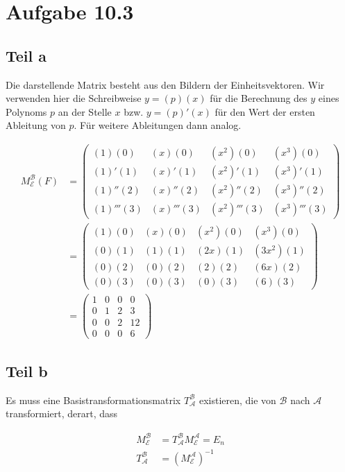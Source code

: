 \documentclass[a4paper,german,12pt,smallheadings]{scrartcl}
\begin{document}
\section*{Aufgabe 10.3}

\subsection*{Teil a}

Die darstellende Matrix besteht aus den Bildern der Einheitsvektoren. Wir
verwenden hier die Schreibweise $y = (p)(x)$ für die Berechnung des $y$ eines
Polynoms $p$ an der Stelle $x$ bzw. $y = (p)'(x)$ für den Wert der ersten
Ableitung von $p$. Für weitere Ableitungen dann analog.

\begin{align*}
  M^{\mathcal{B}}_{\mathcal{E}}(F) &=
\begin{pmatrix}
(1)(0)    & (x)(0)    & (x^2)(0)    & (x^3)(0)    \\
(1)'(1)   & (x)'(1)   & (x^2)'(1)   & (x^3)'(1)   \\
(1)''(2)  & (x)''(2)  & (x^2)''(2)  & (x^3)''(2)  \\
(1)'''(3) & (x)'''(3) & (x^2)'''(3) & (x^3)'''(3)
\end{pmatrix} \\
&=
\begin{pmatrix}
(1)(0) & (x)(0) & (x^2)(0) & (x^3)(0)  \\
(0)(1) & (1)(1) & (2x)(1)  & (3x^2)(1) \\
(0)(2) & (0)(2) & (2)(2)   & (6x)(2)   \\
(0)(3) & (0)(3) & (0)(3)   & (6)(3)
\end{pmatrix} \\
&=
\begin{pmatrix}
1 & 0 & 0 & 0  \\
0 & 1 & 2 & 3  \\
0 & 0 & 2 & 12 \\
0 & 0 & 0 & 6
\end{pmatrix}
\end{align*}

\subsection*{Teil b}

Es muss eine Basistransformationsmatrix $T^{\mathcal{B}}_{\mathcal{A}}$ existieren, die von $\mathcal{B}$ nach $\mathcal{A}$ transformiert, derart, dass

\begin{align*}
  M^{\mathcal{B}}_{\mathcal{E}} &= T^{\mathcal{B}}_{\mathcal{A}} M^{\mathcal{A}}_{\mathcal{E}} = E_n \\
  T^{\mathcal{B}}_{\mathcal{A}} &= \left(M^{\mathcal{A}}_{\mathcal{E}}\right)^{-1} \\
\end{align*}
\end{document}
